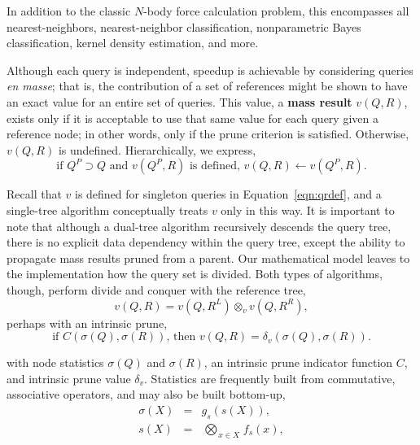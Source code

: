 \documentclass[twoside,leqno,twocolumn]{article}
\newcommand{\summary}{\delta}
\newcommand{\defterm}[1]{{\bf #1}}
\newcommand{\kdleft}[1]{#1^{\!L}}
\newcommand{\kdright}[1]{#1^{\!R}}
\newcommand{\kdparent}[1]{#1^{\!P}}
\newcommand{\nameOp}[2]{\mathop{#1\nolimits\!\!_{#2}}}
\newcommand{\nameop}[2]{#1_{\!#2}}
\newcommand{\myOp}[1]{\nameOp{\bigotimes}{#1}}
\newcommand{\myop}[1]{\nameop{\otimes}{#1}}
\newcommand{\letterqr}{v}
\newcommand{\opqr}{\myop{\letterqr}}
\newcommand{\letterqrv}{v}
\newcommand{\inqrv}{v}
\newcommand{\deltaqrv}{\summary_{\letterqrv}}
\newcommand{\canpruneqrv}{C}%
\newcommand{\letterstat}{s}
\newcommand{\outstat}{\sigma}
\newcommand{\instat}{s}
\newcommand{\Opstat}{\myOp{\letterstat}}
\newcommand{\fstat}{f_{\letterstat}}
\newcommand{\gstat}{g_{\letterstat}}
\begin{document}
\noindent
In addition to the classic $N$-body force calculation problem, this encompasses all nearest-neighbors, nearest-neighbor classification, nonparametric Bayes classification, kernel density estimation, and more.

Although each query is independent, speedup is achievable by considering queries {\it en masse}; that is, the contribution of a set of references might be shown to have an exact value for an entire set of queries.
This value, a \defterm{mass result} $\inqrv(Q, R)$, exists only if it is acceptable to use that same value for each query given a reference node; in other words, only if the prune criterion is satisfied.
Otherwise, $\inqrv(Q,R)$ is undefined.
Hierarchically, we express,
\begin{equation}
\text{if } \kdparent{Q} \supset Q \text{ and }\inqrv(\kdparent{Q}, R)\text{ is defined, } \inqrv(Q, R) \gets \inqrv(\kdparent{Q}, R).
\label{eqn:qrvparent}
\end{equation}

\noindent
Recall that $\inqrv$ is defined for singleton queries in Equation~\ref{eqn:qrdef}, and a single-tree algorithm conceptually treats $\inqrv$ only in this way.
It is important to note that although a dual-tree algorithm recursively descends the query tree, there is no explicit data dependency within the query tree, except the ability to propagate mass results pruned from a parent.
Our mathematical model leaves to the implementation how the query set is divided.
Both types of algorithms, though, perform divide and conquer with the reference tree,
\begin{equation}
\inqrv(Q, R) = \inqrv(Q, \kdleft{R}) \opqr \inqrv(Q, \kdright{R}),
\label{eqn:qrvcompose}
\end{equation}
\noindent perhaps with an intrinsic prune,
\begin{equation}
\text{if } \canpruneqrv(\outstat(Q), \outstat(R)) \text{, then } \inqrv(Q, R) = \deltaqrv(\outstat(Q), \outstat(R)).
\label{eqn:qrvprune}
\end{equation}

\noindent
with node statistics $\outstat(Q)$ and $\outstat(R)$, an intrinsic prune indicator function $\canpruneqrv$, and intrinsic prune value $\deltaqrv$.
Statistics are frequently built from commutative, associative operators, and may also be built bottom-up,
\begin{eqnarray}
\outstat(X) &=& \gstat(\instat(X)),
\\
\instat(X) &=& \Opstat_{x \in X} \fstat(x),
\label{eqn:defstat}
\end{eqnarray}
\end{document}
